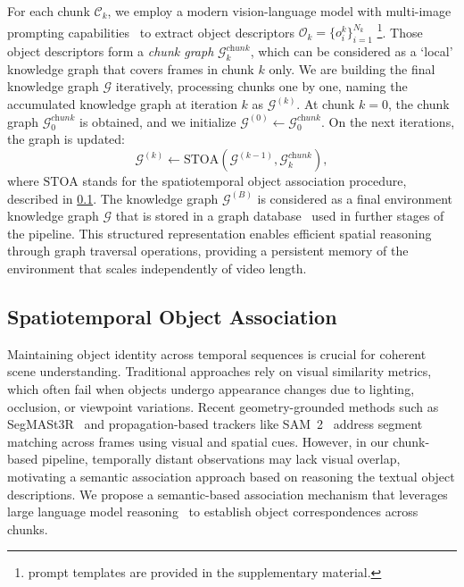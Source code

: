 For each chunk $\mathcal{C}_k$, we employ a modern vision-language model with multi-image prompting capabilities~\cite{comanici2025gemini, bai2025qwen2} to extract object descriptors $\mathcal{O}_k = \{o_i^k\}_{i=1}^{N_k}$ \footnote{prompt templates are provided in the supplementary material.}. Those object descriptors form a \textit{chunk graph} $\mathcal{G}_k^{\textit{chunk}}$, which can be considered as a `local' knowledge graph that covers frames in chunk $k$ only.
We are building the final knowledge graph $\mathcal{G}$ iteratively, processing chunks one by one, naming the accumulated knowledge graph at iteration $k$ as $\mathcal{G}^{(k)}$. At chunk $k=0$, the chunk graph $\mathcal{G}_0^{\textit{chunk}}$ is obtained, and we initialize $\mathcal{G}^{(0)} \leftarrow \mathcal{G}_0^{\textit{chunk}}$. On the next iterations, the graph is updated:
\begin{equation}
\mathcal{G}^{(k)} \leftarrow \text{STOA}(\mathcal{G}^{(k-1)}, \mathcal{G}_k^{\textit{chunk}}),
\end{equation}
where $\text{STOA}$ stands for the spatiotemporal object association procedure, described in \cref{sec:soa}. The knowledge graph $\mathcal{G}^{(B)}$ is considered as a final environment knowledge graph $\mathcal{G}$ that is stored in a graph database~\cite{miller2013graph} used in further stages of the pipeline.
This structured representation enables efficient spatial reasoning through graph traversal operations, providing a persistent memory of the environment that scales independently of video length.

\subsection{Spatiotemporal Object Association} \label{sec:soa}
Maintaining object identity across temporal sequences is crucial for coherent scene understanding.
Traditional approaches rely on visual similarity metrics, which often fail when objects undergo appearance changes due to lighting, occlusion, or viewpoint variations.
Recent geometry-grounded methods such as SegMASt3R~\cite{jayanti2025segmastr} and propagation-based trackers like SAM~2~\cite{ravi2025sam} address segment matching across frames using visual and spatial cues.
However, in our chunk-based pipeline, temporally distant observations may lack visual overlap, motivating a semantic association approach based on reasoning the textual object descriptions.
We propose a semantic-based association mechanism that leverages large language model reasoning~\cite{comanici2025gemini, bai2025qwen2} to establish object correspondences across chunks.


